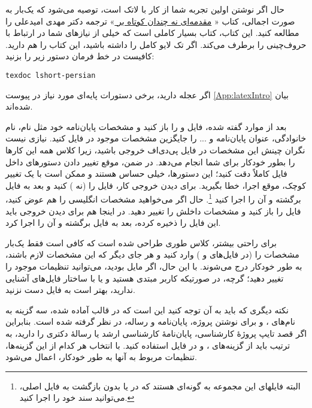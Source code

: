 حال اگر نوشتن \پ اولین تجربه شما از کار با لاتک است، توصیه می‌شود که یک‌بار به صورت اجمالی، کتاب «%
\href{http://www.tug.ctan.org/tex-archive/info/lshort/persian/lshort.pdf}{مقدمه‌ای نه چندان کوتاه بر
\lr{\LaTeXe}}%
»
ترجمه دکتر مهدی امیدعلی را مطالعه کنید. این کتاب، کتاب بسیار کاملی است که خیلی از نیازهای شما در ارتباط با حروف‌چینی را برطرف می‌کند.
اگر تک لایو کامل را داشته باشید، این کتاب را هم دارید. کافیست در خط فرمان دستور زیر را بزنید:
\begin{latin}
	\texttt{texdoc lshort-persian}
\end{latin}
اگر عجله دارید، برخی دستورات پایه‌ای مورد نیاز در پیوست \ref{App:latexIntro} بیان شده‌اند.
 
بعد از موارد گفته شده، فایل 
و
را باز کنید و مشخصات پایان‌نامه خود مثل نام، نام خانوادگی، عنوان پایان‌نامه و ... را جایگزین مشخصات موجود در فایل
 کنید. نیازی نیست نگران چینش این مشخصات در فایل پی‌دی‌اف خروجی باشید، زیرا کلاس 
همه این کارها را بطور خودکار برای شما انجام می‌دهد. در ضمن، موقع تغییر دادن دستورهای داخل فایل
 کاملاً دقت کنید؛ این دستورها، خیلی حساس هستند و ممکن است با یک تغییر کوچک، موقع اجرا، خطا بگیرید. برای دیدن خروجی کار، فایل 
 را 
(نه 
)
کنید و بعد به فایل 
برگشته و آن را اجرا کنید%
\footnote{
	البته فایلهای این مجموعه به گونه‌ای هستند که در
	 یا
	بدون بازگشت به فایل اصلی، می‌توانید سند خود را اجرا کنید.
}.
 حال اگر می‌خواهید مشخصات انگلیسی \پ را هم عوض کنید، فایل 
را باز کنید و مشخصات داخلش را تغییر دهید.
در اینجا هم برای دیدن خروجی باید این فایل را ذخیره کرده، بعد به فایل 
برگشته و آن را اجرا کرد.

برای راحتی بیشتر، کلاس 
طوری طراحی شده است که کافی است فقط  یک‌بار مشخصات \پ را (در فایل‌های
و
)
وارد کنید و هر جای دیگر که این مشخصات لازم باشند، به طور خودکار درج می‌شوند. با این حال، اگر مایل بودید، می‌توانید تنظیمات موجود را تغییر دهید؛ گرچه، در صورتیکه کاربر مبتدی هستید و یا با ساختار فایل‌های  
 آشنایی ندارید، بهتر است به فایل 
دست نزنید.

نکته دیگری که باید به آن توجه کنید این است که در قالب آماده شده، سه گزینه به نام‌های
،
و
برای نوشتن پروژه، پایان‌نامه و رساله، در نظر گرفته شده است. بنابراین اگر قصد تایپ پروژهٔ کارشناسی، پایان‌نامهٔ کارشناسی ارشد یا رسالهٔ دکتری را دارید، به ترتیب باید از گزینه‌های
،
و
در فایل 
استفاده کنید. با انتخاب هر کدام از این گزینه‌ها، تنظیمات مربوط به آنها به طور خودکار، اعمال می‌شود.



